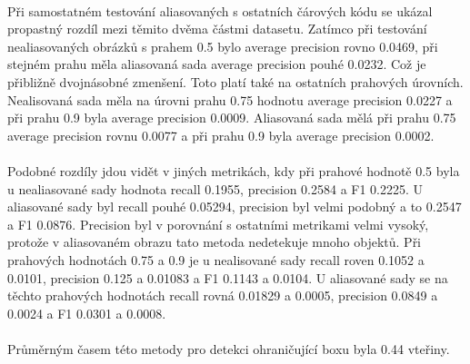 \paragraph{} Při samostatném testování aliasovaných s ostatních čárových kódu se ukázal propastný rozdíl mezi těmito dvěma částmi datasetu. Zatímco při testování nealiasovaných obrázků s prahem 0.5 bylo average precision rovno 0.0469, při stejném prahu měla aliasovaná sada average precision pouhé 0.0232. Což je přibližně dvojnásobné zmenšení. Toto platí také na ostatních prahových úrovních. Nealisovaná sada měla na úrovni prahu 0.75 hodnotu average precision 0.0227 a při prahu 0.9 byla average precision 0.0009. Aliasovaná sada mělá při prahu 0.75 average precision rovnu 0.0077 a při prahu 0.9 byla average precision 0.0002.

\paragraph{} Podobné rozdíly jdou vidět v jiných metrikách, kdy při prahové hodnotě 0.5 byla u nealiasované sady hodnota recall 0.1955, precision 0.2584 a F1 0.2225. U aliasované sady byl recall pouhé 0.05294, precision byl velmi podobný a to 0.2547 a F1 0.0876. Precision byl v porovnání s ostatními metrikami velmi vysoký, protože v aliasovaném obrazu tato metoda nedetekuje mnoho objektů. Při prahových hodnotách 0.75 a 0.9 je u nealisované sady recall roven 0.1052 a 0.0101, precision 0.125 a 0.01083 a F1 0.1143 a 0.0104. U aliasované sady se na těchto prahových hodnotách recall rovná 0.01829 a 0.0005, precision 0.0849 a 0.0024 a F1 0.0301 a 0.0008.

\paragraph{} Průměrným časem této metody  pro detekci ohraničující boxu byla 0.44 vteřiny.

